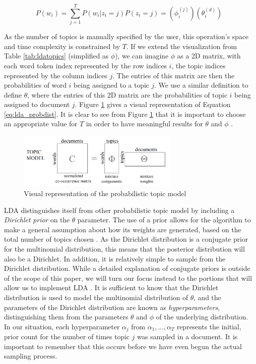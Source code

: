 \documentclass[a4paper]{article}
\begin{document}
\begin{equation}\label{eq:lda_probdist}
  P(w_i) = \sum\limits_{j=1}^T P(w_i | z_i = j) P(z_i = j) = (\phi^{(j)}_i) (\theta^{(d)}_i)
\end{equation}

As the number of topics is manually specified by the user, this operation's space and time complexity is constrained by $T$. If we extend the visualization from Table \ref{tab:ldatopics} (simplified as $\phi$), we can imagine $\phi$ as a 2D matrix, with each word token index represented by the row indices $i$, the topic indices represented by the column indices $j$. The entries of this matrix are then the probabilities of word $i$ being assigned to a topic $j$. We use a similar definition to define $\theta$, where the entries of this 2D matrix are the probabilities of topic $i$ being assigned to document $j$. Figure \ref{fig:topicmodel} gives a visual representation of Equation \ref{eq:lda_probdist}. It is clear to see from Figure \ref{fig:topicmodel} that it is important to choose an appropriate value for $T$ in order to have meaningful results for $\theta$ and $\phi$ \cite{lda}.

\begin{figure}[h]
  \centering
    \includegraphics[width=0.7\textwidth]{topicmodel}
  \caption {Visual representation of the probabilistic topic model}
  \label{fig:topicmodel}
\end{figure}

LDA distinguishes itself from other probabilistic topic model by including a \textit{Dirichlet prior} on the $\theta$ parameter. The use of a prior allows for the algorithm to make a general assumption about how its weights are generated, based on the total number of topics chosen \cite{hoffman}. As the Dirichlet distribution is a conjugate prior for the multinomial distribution, this means that the posterior distribution will also be a Dirichlet. In addition, it is relatively simple to sample from the Dirichlet distribution. While a detailed explanation of conjugate priors is outside of the scope of this paper, we will turn our focus instead to the portions that will allow us to implement LDA \cite{lda}. It is sufficient to know that the Dirichlet distribution is used to model the multinomial distribution of $\theta$, and the parameters of the Dirichlet distribution are known as \textit{hyperparameters}, distinguishing them from the parameters $\theta$ and $\phi$ of the underlying distribution. In our situation, each hyperparameter $\alpha_j$ from $\alpha_1, ..., \alpha_T$ represents the initial, prior count for the number of times topic $j$ was sampled in a document. It is important to remember that this occurs before we have even begun the actual sampling process.
\end{document}
